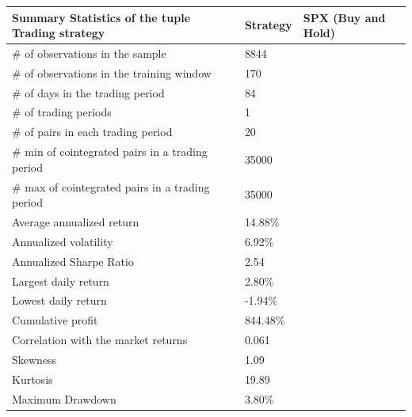 \documentclass[11pt,a4,twosided,singlespacing,titlepagenumber=on]{scrreprt}
\numberwithin{equation}{chapter} %
\theoremstyle{remark}
\begin{document}
\begin{table}[H]
\centering
\begin{tabular}{lll}
\hline
Summary Statistics of the tuple Trading strategy  			& Strategy & SPX (Buy and Hold)\\ \hline
\# of observations in the sample								& 8844  \\
\# of observations in the training window						& 170 \\
\# of days in the trading period								& 84 \\
\# of trading periods											& 1\\
\# of pairs in each trading period   							& 20\\
\# min of cointegrated pairs in a trading period 				& 35000\\
\# max of cointegrated pairs in a trading period 				& 35000\\
Average annualized return 										& 14.88\% \\
Annualized volatility 											& 6.92\% \\
Annualized Sharpe Ratio 										& 2.54  \\
Largest daily return 											& 2.80\% \\
Lowest daily return 											& -1.94\% \\
Cumulative profit 												& 844.48\%\\
Correlation with the market returns 							& 0.061\\
Skewness														& 1.09\\
Kurtosis 														& 19.89\\
Maximum Drawdown  												& 3.80\% \\
\hline
\end{tabular}
\end{table}



\end{document}
